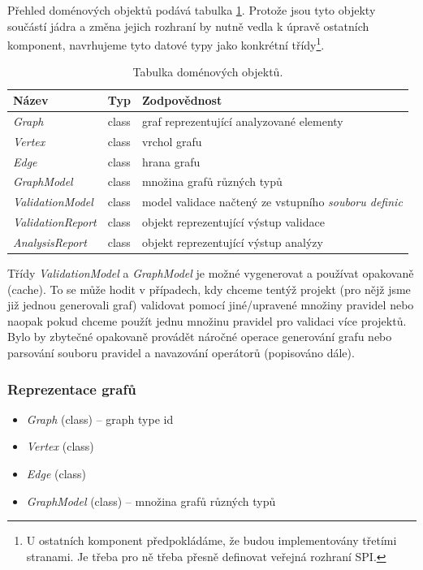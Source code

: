 Přehled doménových objektů podává tabulka \ref{design-domain_object_table}. Protože jsou tyto objekty součástí jádra a změna jejich rozhraní by nutně vedla k úpravě ostatních komponent, navrhujeme tyto datové typy jako konkrétní třídy\footnote{U ostatních komponent předpokládáme, že budou implementovány třetími stranami. Je třeba pro ně třeba přesně definovat veřejná rozhraní SPI.}.

\begin{table}[h]
  \caption{Tabulka doménových objektů. \label{design-domain_object_table}}
  \begin{center}
    \begin{tabular}{| l | c | p{8cm} |}
      \hline
      \textbf{Název} & \textbf{Typ} & \textbf{Zodpovědnost} \\
      \hline
      \hline
      \emph{Graph} & class & graf reprezentující analyzované elementy \\ \hline
      \emph{Vertex} & class &  vrchol grafu \\ \hline
      \emph{Edge} & class & hrana grafu \\ \hline
      \emph{GraphModel} & class & množina grafů různých typů \\ \hline
      \hline
      \emph{ValidationModel} & class & model validace načtený ze vstupního \emph{souboru definic} \\ \hline
      \hline
      \emph{ValidationReport} & class &  objekt reprezentující výstup validace\\ \hline
      \emph{AnalysisReport} & class & objekt reprezentující výstup analýzy \\ \hline
    \end{tabular}
  \end{center}

\end{table}

Třídy \emph{ValidationModel} a \emph{GraphModel} je možné vygenerovat a používat opakovaně (cache). To se může hodit v případech, kdy chceme tentýž projekt (pro nějž jsme již jednou generovali graf) validovat pomocí jiné/upravené množiny pravidel nebo naopak pokud chceme použít jednu množinu pravidel pro validaci více projektů. Bylo by zbytečné opakovaně provádět náročné operace generování grafu nebo parsování souboru pravidel a navazování operátorů (popisováno dále).

\subsubsection{Reprezentace grafů}
\begin{itemize}
\item \emph{Graph} (class) -- graph type id
\item \emph{Vertex} (class)
\item \emph{Edge} (class)
\item \emph{GraphModel} (class) -- množina grafů různých typů
\end{itemize}


